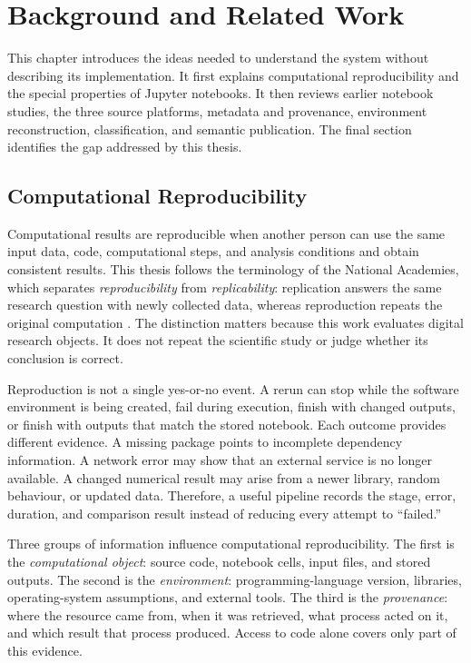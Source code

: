 \chapter{Background and Related Work}
\label{chap:background}

This chapter introduces the ideas needed to understand the system without describing its implementation. It first explains computational reproducibility and the special properties of Jupyter notebooks. It then reviews earlier notebook studies, the three source platforms, metadata and provenance, environment reconstruction, classification, and semantic publication. The final section identifies the gap addressed by this thesis.

\section{Computational Reproducibility}

Computational results are reproducible when another person can use the same input data, code, computational steps, and analysis conditions and obtain consistent results. This thesis follows the terminology of the National Academies, which separates \emph{reproducibility} from \emph{replicability}: replication answers the same research question with newly collected data, whereas reproduction repeats the original computation \cite{nasem2019}. The distinction matters because this work evaluates digital research objects. It does not repeat the scientific study or judge whether its conclusion is correct.

Reproduction is not a single yes-or-no event. A rerun can stop while the software environment is being created, fail during execution, finish with changed outputs, or finish with outputs that match the stored notebook. Each outcome provides different evidence. A missing package points to incomplete dependency information. A network error may show that an external service is no longer available. A changed numerical result may arise from a newer library, random behaviour, or updated data. Therefore, a useful pipeline records the stage, error, duration, and comparison result instead of reducing every attempt to ``failed.''

Three groups of information influence computational reproducibility. The first is the \emph{computational object}: source code, notebook cells, input files, and stored outputs. The second is the \emph{environment}: programming-language version, libraries, operating-system assumptions, and external tools. The third is the \emph{provenance}: where the resource came from, when it was retrieved, what process acted on it, and which result that process produced. Access to code alone covers only part of this evidence.

